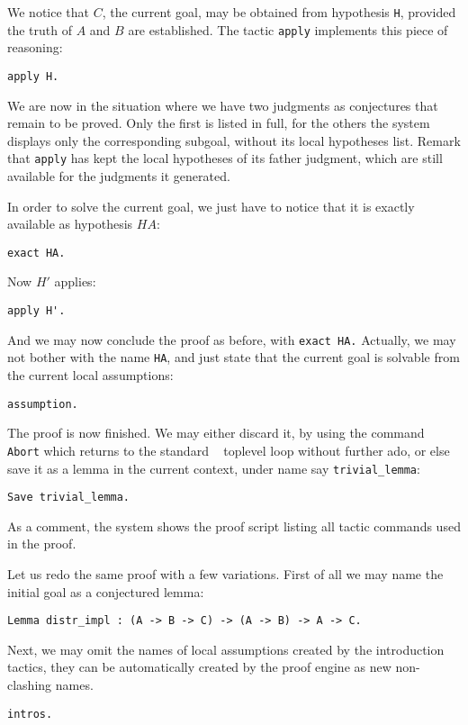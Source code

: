 \documentclass{book}
\begin{document}
We notice that $C$, the current goal, may be obtained from hypothesis
\verb:H:, provided the truth of $A$ and $B$ are established.
The tactic \verb:apply: implements this piece of reasoning:
\begin{lstlisting}
apply H.
\end{lstlisting}

We are now in the situation where we have two judgments as conjectures
that remain to be proved. Only the first is listed in full, for the
others the system displays only the corresponding subgoal, without its
local hypotheses list. Remark that \verb:apply: has kept the local
hypotheses of its father judgment, which are still available for
the judgments it generated.

In order to solve the current goal, we just have to notice that it is
exactly available as hypothesis $HA$:
\begin{lstlisting}
exact HA.
\end{lstlisting}

Now $H'$ applies:
\begin{lstlisting}
apply H'.
\end{lstlisting}

And we may now conclude the proof as before, with \verb:exact HA.:
Actually, we may not bother with the name \verb:HA:, and just state that
the current goal is solvable from the current local assumptions:
\begin{lstlisting}
assumption.
\end{lstlisting}

The proof is now finished. We may either discard it, by using the
command \verb:Abort: which returns to the standard \Coq~ toplevel loop
without further ado, or else save it as a lemma in the current context,
under name say \verb:trivial_lemma::
\begin{lstlisting}
Save trivial_lemma.
\end{lstlisting}

As a comment, the system shows the proof script listing all tactic
commands used in the proof. 

Let us redo the same proof with a few variations. First of all we may name
the initial goal as a conjectured lemma:
\begin{lstlisting}
Lemma distr_impl : (A -> B -> C) -> (A -> B) -> A -> C.
\end{lstlisting}

Next, we may omit the names of local assumptions created by the introduction
tactics, they can be automatically created by the proof engine as new
non-clashing names.
\begin{lstlisting}
intros.
\end{lstlisting}
\end{document}
